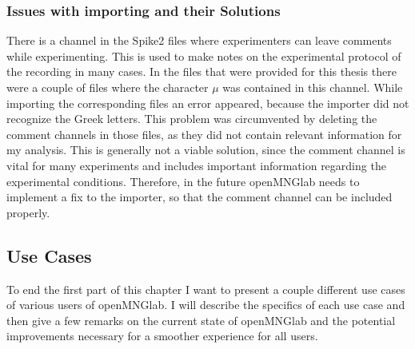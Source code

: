 \subsubsection{Issues with importing and their Solutions}
There is a channel in the Spike2 files where experimenters can leave comments while experimenting. This is used to make notes on the experimental protocol of the recording in many cases. In the files that were provided for this thesis there were a couple of files where the character $\mu$ was contained in this channel. While importing the corresponding files an error appeared, because the importer did not recognize the Greek letters. This problem was circumvented by deleting the comment channels in those files, as they did not contain relevant information for my analysis. This is generally not a viable solution, since the comment channel is vital for many experiments and includes important information regarding the experimental conditions. Therefore, in the future openMNGlab needs to implement a fix to the importer, so that the comment channel can be included properly.

\subsection{Use Cases}
To end the first part of this chapter I want to present a couple different use cases of various users of openMNGlab. I will describe the specifics of each use case and then give a few remarks on the current state of openMNGlab and the potential improvements necessary for a smoother experience for all users.

